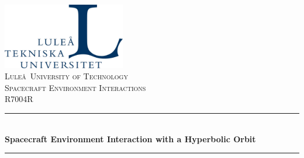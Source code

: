 
\begin{titlepage} %
	\center %
	\newcommand{\HRule}{\rule{\linewidth}{0.5mm}} %
	
	
	\includegraphics[width=0.4\textwidth, trim=0 0 0 -2cm]{figures/LTU_logo.jpg}\\[1cm]
		
	
	\textsc{\Huge Lule\aa \ University of Technology}\\[1.5cm]
	
	\textsc{\LARGE Spacecraft Environment Interactions}\\[0.3cm]
	
	\textsc{\large R7004R}\\[0.5cm]
	
	
	\HRule\\[0.4cm]
	
	{\Huge\bfseries Spacecraft Environment Interaction with a Hyperbolic Orbit}\\[0.4cm]
	
	\HRule\\[1.5cm]
	

\end{titlepage}
